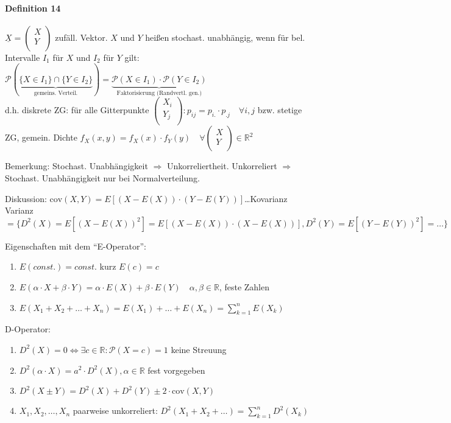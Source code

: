\documentclass[a4paper]{scrartcl}
\begin{document}
\paragraph{Definition 14} $\underline{X} = \begin{pmatrix} X \\ Y \\ \end{pmatrix}$ zufäll. Vektor. $X$ und $Y$ heißen stochast. unabhängig, wenn für bel. Intervalle $I_1$ für $X$ und $I_2$ für $Y$ gilt: $\mathcal{P} ( \underbrace{ \{ X \in I_1 \} \cap \{ Y \in I_2 \}}_{\text{gemeins. Verteil.}}) = \underbrace{\mathcal{P} (X \in I_1) \cdot \mathcal{P} (Y \in I_2)}_{\text{Faktorisierung (Randvertl. gen.)}}$\\
d.h. diskrete ZG: für alle Gitterpunkte $\begin{pmatrix} X_i \\ Y_j\\ \end{pmatrix} : p_{ij} = p_{i.} \cdot p_{.j} \quad \forall i,j$ bzw. stetige ZG, gemein. Dichte $f_X (x,y) = f_X (x) \cdot f_Y (y)  \quad \forall \begin{pmatrix} X \\ Y \\ \end{pmatrix} \in \mathbb{R}^2$

Bemerkung: Stochast. Unabhängigkeit $\Rightarrow$ Unkorreliertheit. Unkorreliert $\Rightarrow$ Stochast. Unabhängigkeit nur bei Normalverteilung.

Diskussion: $\text{cov} (X,Y) = E[(X-E(X)) \cdot (Y-E(Y)) ]$\dots Kovarianz\\
Varianz $ = \{ D^2 (X) = E[(X-E(X))^2] = E[(X-E(X)) \cdot (X-E(X))], D^2(Y) = E[(Y-E(Y))^2] = \dots \}$

Eigenschaften mit dem "`E-Operator"':
\begin{enumerate}
\item $E(const.) = const.$ kurz $E(c) = c$
\item $E(\alpha \cdot X + \beta \cdot Y) = \alpha \cdot E(X) + \beta \cdot E(Y) \quad \alpha , \beta \in \mathbb{R}$, feste Zahlen
\item $E(X_1+X_2+\dots+X_n) = E(X_1) + \dots + E(X_n) = \sum\limits_{k=1}^{n} E(X_k)$
\end{enumerate}


D-Operator:
\begin{enumerate}
\item $D^2 (X) = 0 \Leftrightarrow \exists c \in \mathbb{R}: \mathcal{P} (X=c) = 1$ keine Streuung
\item $D^2 (\alpha \cdot X) = a^2 \cdot D^2(X), \alpha \in \mathbb{R}$ fest vorgegeben
\item $D^2 (X \pm Y) = D^2(X) + D^2 (Y) \pm 2 \cdot \text{cov} (X,Y)$
\item $X_1,X_2,\dots,X_n$ paarweise unkorreliert: $D^2(X_1 + X_2 + \dots) = \sum\limits_{k=1}^{n} D^2 (X_k)$
\end{enumerate}
\end{document}
